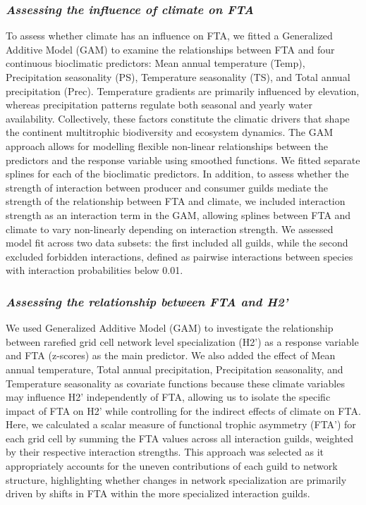 \documentclass[
]{agujournal2019}
\begin{document}
\subsubsection{\texorpdfstring{\emph{Assessing the influence of climate
on
FTA}}{Assessing the influence of climate on FTA}}\label{assessing-the-influence-of-climate-on-fta}

To assess whether climate has an influence on FTA, we fitted a
Generalized Additive Model (GAM) to examine the relationships between
FTA and four continuous bioclimatic predictors: Mean annual temperature
(Temp), Precipitation seasonality (PS), Temperature seasonality (TS),
and Total annual precipitation (Prec). Temperature gradients are
primarily influenced by elevation, whereas precipitation patterns
regulate both seasonal and yearly water availability. Collectively,
these factors constitute the climatic drivers that shape the continent
multitrophic biodiversity and ecosystem dynamics. The GAM approach
allows for modelling flexible non-linear relationships between the
predictors and the response variable using smoothed functions. We fitted
separate splines for each of the bioclimatic predictors. In addition, to
assess whether the strength of interaction between producer and consumer
guilds mediate the strength of the relationship between FTA and climate,
we included interaction strength as an interaction term in the GAM,
allowing splines between FTA and climate to vary non-linearly depending
on interaction strength. We assessed model fit across two data subsets:
the first included all guilds, while the second excluded forbidden
interactions, defined as pairwise interactions between species with
interaction probabilities below 0.01.

\subsubsection{\texorpdfstring{\emph{Assessing the relationship between
FTA and
H2'}}{Assessing the relationship between FTA and H2'}}\label{assessing-the-relationship-between-fta-and-h2}

We used Generalized Additive Model (GAM) to investigate the relationship
between rarefied grid cell network level specialization (H2') as a
response variable and FTA (z-scores) as the main predictor. We also
added the effect of Mean annual temperature, Total annual precipitation,
Precipitation seasonality, and Temperature seasonality as covariate
functions because these climate variables may influence H2'
independently of FTA, allowing us to isolate the specific impact of FTA
on H2' while controlling for the indirect effects of climate on FTA.
Here, we calculated a scalar measure of functional trophic asymmetry
(FTA') for each grid cell by summing the FTA values across all
interaction guilds, weighted by their respective interaction strengths.
This approach was selected as it appropriately accounts for the uneven
contributions of each guild to network structure, highlighting whether
changes in network specialization are primarily driven by shifts in FTA
within the more specialized interaction guilds.
\end{document}
